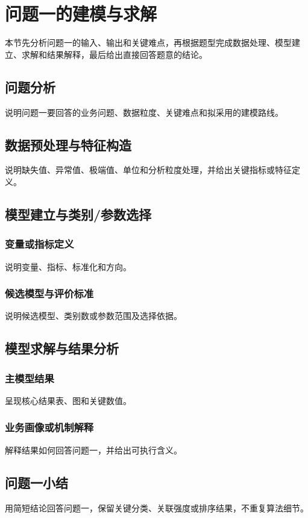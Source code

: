 \section{问题一的建模与求解}

本节先分析问题一的输入、输出和关键难点，再根据题型完成数据处理、模型建立、求解和结果解释，最后给出直接回答题意的结论。

\subsection{问题分析}
说明问题一要回答的业务问题、数据粒度、关键难点和拟采用的建模路线。

\subsection{数据预处理与特征构造}
说明缺失值、异常值、极端值、单位和分析粒度处理，并给出关键指标或特征定义。

\subsection{模型建立与类别/参数选择}
\subsubsection{变量或指标定义}
说明变量、指标、标准化和方向。

\subsubsection{候选模型与评价标准}
说明候选模型、类别数或参数范围及选择依据。

\subsection{模型求解与结果分析}
\subsubsection{主模型结果}
呈现核心结果表、图和关键数值。

\subsubsection{业务画像或机制解释}
解释结果如何回答问题一，并给出可执行含义。

\subsection{问题一小结}
用简短结论回答问题一，保留关键分类、关联强度或排序结果，不重复算法细节。

